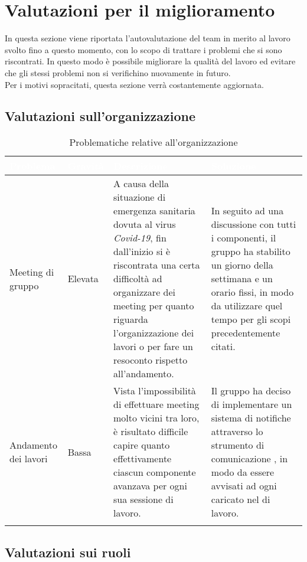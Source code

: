 \section{Valutazioni per il miglioramento}

In questa sezione viene riportata l'autovalutazione del team in merito al lavoro svolto fino a questo momento, con lo scopo di trattare i problemi che si sono riscontrati. In questo modo è possibile migliorare la qualità del lavoro ed evitare che gli stessi problemi non si verifichino nuovamente in futuro.\\Per i motivi sopracitati, questa sezione verrà costantemente aggiornata.

\subsection{Valutazioni sull'organizzazione}
\renewcommand{\arraystretch}{1.5}
\centering
\begin{longtable}{C{2.5cm} C{2.5cm} C{6cm} C{5cm}}
\textcolor{white}{\textbf{Problema}} &
\textcolor{white}{\textbf{Gravità}} &
\textcolor{white}{\textbf{Descrizione}} &	
\textcolor{white}{\textbf{Soluzione}} \\	
\endhead

Meeting di gruppo &
Elevata & 
A causa della situazione di emergenza sanitaria dovuta al virus \textit{Covid-19}, fin dall'inizio si è riscontrata una certa difficoltà ad organizzare dei meeting per quanto riguarda l'organizzazione dei lavori o per fare un resoconto rispetto all'andamento. &
In seguito ad una discussione con tutti i componenti, il gruppo ha stabilito un giorno della settimana e un orario fissi, in modo da utilizzare quel tempo per gli scopi precedentemente citati. \\

Andamento dei lavori &
Bassa & 
Vista l'impossibilità di effettuare meeting molto vicini tra loro, è risultato difficile capire quanto effettivamente ciascun componente avanzava per ogni sua sessione di lavoro. &
Il gruppo ha deciso di implementare un sistema di notifiche attraverso lo strumento di comunicazione , in modo da essere avvisati ad ogni  caricato nel  di lavoro. \\

 \caption{Problematiche relative all'organizzazione}
\end{longtable}


\subsection{Valutazioni sui ruoli}

